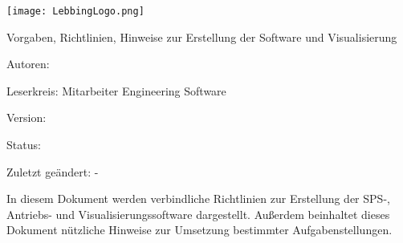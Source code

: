 \begin{titlepage}

    
    \begin{center} 
    \texttt{[image: LebbingLogo.png]}
    \par\vspace{1.5cm}
    {\scshape\Large \company\par}
    \vspace{2cm}
    
    {\Huge\textbf{\titlename}\par}
    \vspace{0.5cm}
    {\Large Vorgaben, Richtlinien, Hinweise zur Erstellung der Software und Visualisierung\par}
    \vspace{1.5cm}
\end{center}
    
        {Autoren:   \authorname~\par}
        {Leserkreis:  Mitarbeiter Engineering Software \par}
        {Version:   \lastchanged\par}
        {Status:   \state\par}
        {Zuletzt geändert:   \lasteditor -\par}
        {\company\par}
        {\lastchanged\par}        

        \vspace{3cm}
        \noindent In diesem Dokument werden verbindliche Richtlinien zur Erstellung der SPS-, Antriebs- und Visualisierungssoftware dargestellt. Außerdem beinhaltet dieses Dokument nützliche Hinweise zur Umsetzung bestimmter Aufgabenstellungen.
    
    \end{titlepage}